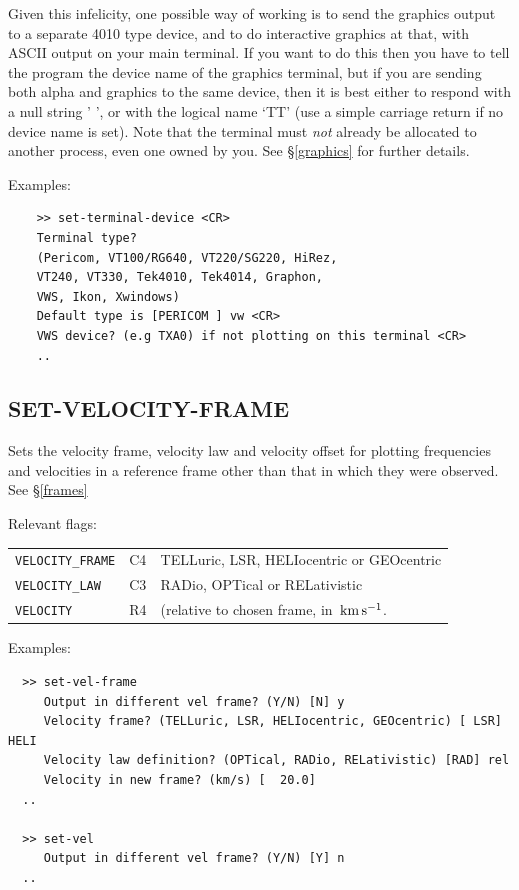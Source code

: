 \documentclass[11pt,twoside]{report}
\newcommand{\kms}{{\rm\,km\,s^{-1}}}
\begin{document}
Given this infelicity, one possible way of working is to send the graphics
output to a separate 4010 type device, and to do interactive graphics
at that, with ASCII output on your main terminal. If you want to do this
then you have to tell the program the device name of the graphics terminal,
but if you are sending both alpha and graphics to the same device, then
it is best either to respond with a null string ' ', or with the logical name
`TT' (use a simple carriage return if no device name is set). Note that the
terminal must {\em not} already be allocated to another process, even one
owned by you. See \S\ref{graphics} for further details.

Examples:
\begin{verbatim}
    >> set-terminal-device <CR>
    Terminal type?
    (Pericom, VT100/RG640, VT220/SG220, HiRez,
    VT240, VT330, Tek4010, Tek4014, Graphon,
    VWS, Ikon, Xwindows)
    Default type is [PERICOM ] vw <CR>
    VWS device? (e.g TXA0) if not plotting on this terminal <CR>
    ..
\end{verbatim}

\subsection{SET-VELOCITY-FRAME} 

Sets the velocity frame, velocity law and velocity offset for plotting 
frequencies and velocities in a reference frame other than that in which
they were observed. See \S\ref{frames}

Relevant flags:\\
\begin{tabular}{lll}
   \verb+VELOCITY_FRAME+ & C4 & TELLuric, LSR, HELIocentric or GEOcentric\\
   \verb+VELOCITY_LAW+ & C3 & RADio, OPTical or RELativistic\\
   \verb+VELOCITY+ & R4 & (relative to chosen frame, in $\kms$.
\end{tabular}

Examples:
\begin{verbatim}
  >> set-vel-frame
     Output in different vel frame? (Y/N) [N] y
     Velocity frame? (TELLuric, LSR, HELIocentric, GEOcentric) [ LSR] HELI
     Velocity law definition? (OPTical, RADio, RELativistic) [RAD] rel
     Velocity in new frame? (km/s) [  20.0] 
  ..

  >> set-vel
     Output in different vel frame? (Y/N) [Y] n
  ..
\end{verbatim}
\end{document}
